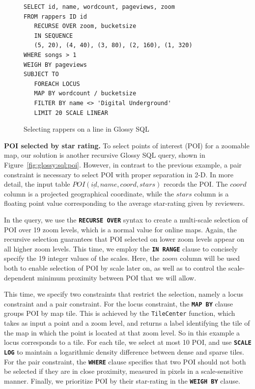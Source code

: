 \documentclass[11pt, oneside]{report}
\newcommand{\minisec}[1]{\noindent\textbf{#1.}}
\begin{document}
\begin{figure}[!t]
\begin{center}
\begin{lstlisting}
SELECT id, name, wordcount, pageviews, zoom
FROM rappers ID id
   RECURSE OVER zoom, bucketsize 
   IN SEQUENCE 
   (5, 20), (4, 40), (3, 80), (2, 160), (1, 320)
WHERE songs > 1
WEIGH BY pageviews
SUBJECT TO
   FOREACH LOCUS
   MAP BY wordcount / bucketsize
   FILTER BY name <> 'Digital Underground'
   LIMIT 20 SCALE LINEAR
\end{lstlisting}
\vspace*{-2ex}
\caption{Selecting rappers on a line in Glossy SQL}
\label{fig:glossy:sql:rappers}
\end{center}
\vspace*{-5ex}
\end{figure}

\minisec{POI selected by star rating}
To select points of interest (POI) for a zoomable map, our solution is another recursive Glossy SQL query, shown in Figure~\ref{fig:glossy:sql:poi}. However, in contrast to the previous example, a pair constraint is necessary to select POI with proper separation in 2-D. 
In more detail, the input table $POI(\underline{id}, name, coord, stars)$ records the POI. The $coord$ column is a projected geographical coordinate, while the $stars$ column is a floating point value corresponding to the average star-rating given by reviewers.

In the query, we use the \textbf{\texttt{RECURSE OVER}} syntax to create a multi-scale selection of POI over 19 zoom levels, which is a normal value for online maps. Again, the recursive selection guarantees that POI selected on lower zoom levels appear on all higher zoom levels. This time, we employ the \textbf{\texttt{IN RANGE}} clause to concisely specify the 19 integer values of the scales. Here, the $zoom$ column will be used both to enable selection of POI by scale later on, as well as to control the scale-dependent minimum proximity between POI that we will allow.

This time, we specify two constraints that restrict the selection, namely a locus constraint and a pair constraint. For the locus constraint, the \textbf{\texttt{MAP BY}} clause groups POI by map tile. This is achieved by the \texttt{TileCenter} function, which takes as input a point and a zoom level, and returns a label identifying the tile of the map in which the point is located at that zoom level. So in this example a locus corresponds to a tile. For each tile, we select at most 10 POI, and use \textbf{\texttt{SCALE LOG}} to maintain a logarithmic density difference between dense and sparse tiles. For the pair constraint, the \textbf{\texttt{WHERE}} clause specifies that two POI should not both be selected if they are in close proximity, measured in pixels in a scale-sensitive manner. Finally, we prioritize POI by their star-rating in the \textbf{\texttt{WEIGH BY}} clause. 
\end{document}

